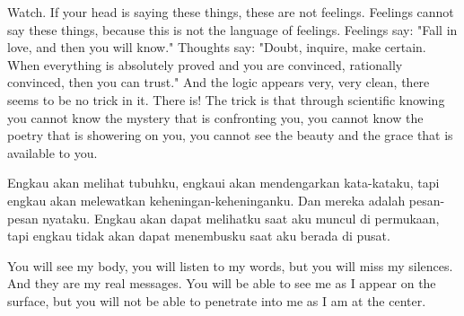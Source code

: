 \english
Watch. If your head is saying these things, these are not feelings. Feelings cannot say these things, because this is not the language of feelings. Feelings say: "Fall in love, and then you will know." Thoughts say: "Doubt, inquire, make certain. When everything is absolutely proved and you are convinced, rationally convinced, then you can trust." And the logic appears very, very clean, there seems to be no trick in it. There is! The trick is that through scientific knowing you cannot know the mystery that is confronting you, you cannot know the poetry that is showering on you, you cannot see the beauty and the grace that is available to you.

\bahasa
Engkau akan melihat tubuhku, engkaui akan mendengarkan kata-kataku, tapi engkau akan melewatkan keheningan-keheninganku. Dan mereka adalah pesan-pesan nyataku. Engkau akan dapat melihatku saat aku muncul di permukaan, tapi engkau tidak akan dapat menembusku saat aku berada di pusat.

\english
You will see my body, you will listen to my words, but you will miss my silences. And they are my real messages. You will be able to see me as I appear on the surface, but you will not be able to penetrate into me as I am at the center.



